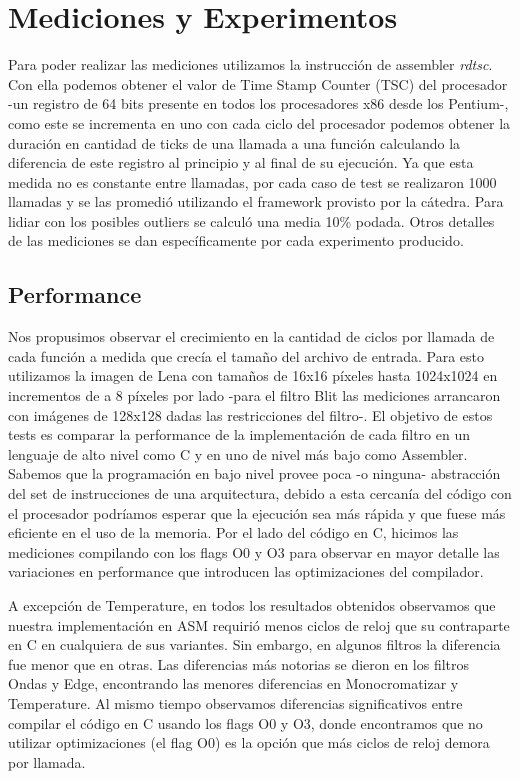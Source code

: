 \section{Mediciones y Experimentos}

Para poder realizar las mediciones utilizamos la instrucción de assembler \textit{rdtsc}. Con ella podemos obtener el valor de Time Stamp Counter (TSC) del procesador -un registro de 64 bits presente en todos los procesadores x86 desde los Pentium-, como este se incrementa en uno con cada ciclo del procesador podemos obtener la duración en cantidad de ticks de una llamada a una función calculando la diferencia de este registro al principio y al final de su ejecución. Ya que esta medida no es constante entre llamadas, por cada caso de test se realizaron 1000 llamadas y se las promedió utilizando el framework provisto por la cátedra. Para lidiar con los posibles outliers se calculó una media 10\% podada. Otros detalles de las mediciones se dan específicamente por cada experimento producido.

\subsection{Performance}

Nos propusimos observar el crecimiento en la cantidad de ciclos por llamada de cada función a medida que crecía el tamaño del archivo de entrada. Para esto utilizamos la imagen de Lena con tamaños de 16x16 píxeles hasta 1024x1024 en incrementos de a 8 píxeles por lado -para el filtro Blit las mediciones arrancaron con imágenes de 128x128 dadas las restricciones del filtro-. El objetivo de estos tests es comparar la performance de la implementación de cada filtro en un lenguaje de alto nivel como C y en uno de nivel más bajo como Assembler. Sabemos que la programación en bajo nivel provee poca -o ninguna- abstracción del set de instrucciones de una arquitectura, debido a esta cercanía del código con el procesador podríamos esperar que la ejecución sea más rápida y que fuese más eficiente en el uso de la memoria. Por el lado del código en C, hicimos las mediciones compilando con los flags O0 y O3 para observar en mayor detalle las variaciones en performance que introducen las optimizaciones del compilador.

A excepción de Temperature, en todos los resultados obtenidos observamos que nuestra implementación en ASM requirió menos ciclos de reloj que su contraparte en C en cualquiera de sus variantes. Sin embargo, en algunos filtros la diferencia fue menor que en otras. Las diferencias más notorias se dieron en los filtros Ondas y Edge, encontrando las menores diferencias en Monocromatizar y Temperature. Al mismo tiempo observamos diferencias significativos entre compilar el código en C usando los flags O0 y O3, donde encontramos que no utilizar optimizaciones (el flag O0) es la opción que más ciclos de reloj demora por llamada. 

